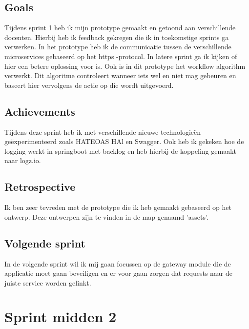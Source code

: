 \documentclass[11pt, twoside]{report}
\begin{document}
    \subsection{Goals}\label{subsec:goals=1}
    Tijdens sprint 1 heb ik mijn prototype gemaakt en getoond aan verschillende docenten.
    Hierbij heb ik feedback gekregen die ik in toekomstige sprints ga verwerken.
    In het prototype heb ik de communicatie tussen de verschillende microservices gebaseerd op het https
    -protocol.
    In latere sprint ga ik kijken of hier een betere oplossing voor is.
    Ook is in dit prototype het workflow algorithm verwerkt.
    Dit algoritme controleert wanneer iets wel en niet mag gebeuren en baseert hier vervolgens de actie op die wordt
    uitgevoerd.


    \subsection{Achievements}\label{subsec:achievements-1}
    Tijdens deze sprint heb ik met verschillende nieuwe technologieën geëxperimenteerd zoals HATEOAS HAl en Swagger.
    Ook heb ik gekeken hoe de logging werkt in springboot met backlog en heb hierbij de koppeling gemaakt naar logz.io.

    \subsection{Retrospective}\label{subsec:retrospective-1}
    Ik ben zeer tevreden met de prototype die ik heb gemaakt gebaseerd op het ontwerp.
    Deze ontwerpen zijn te vinden in de map genaamd 'assets'.

    \subsection{Volgende sprint}\label{subsec:volgende-sprint-1}
    In de volgende sprint wil ik mij gaan focussen op de gateway module die de applicatie moet gaan beveiligen en er
    voor gaan zorgen dat requests naar de juiste service worden gelinkt.


    \newpage
    \section{Sprint midden 2}
    \label{sec:sprint-2}
\end{document}

